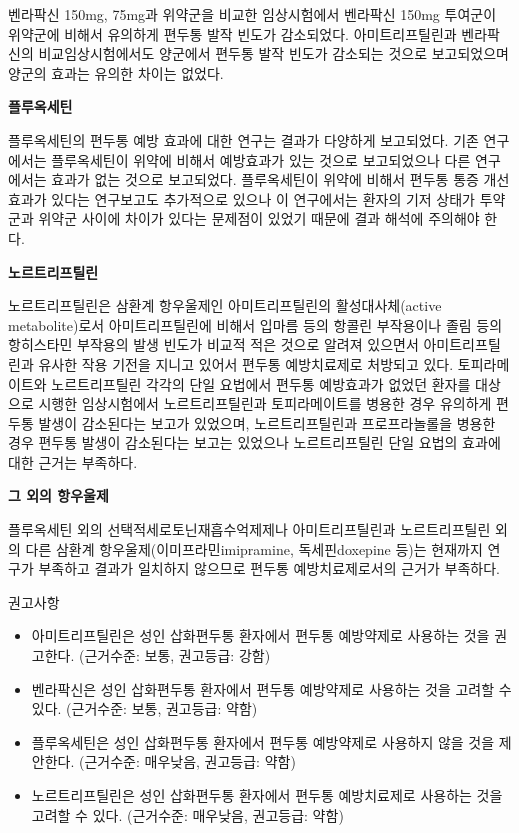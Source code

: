 \documentclass[]{book}
\begin{document}
벤라팍신 150mg, 75mg과 위약군을 비교한 임상시험에서 벤라팍신 150mg 투여군이 위약군에 비해서 유의하게 편두통 발작 빈도가 감소되었다. 아미트리프틸린과 벤라팍신의 비교임상시험에서도 양군에서 편두통 발작 빈도가 감소되는 것으로 보고되었으며 양군의 효과는 유의한 차이는 없었다.

\textbf{플루옥세틴}

플루옥세틴의 편두통 예방 효과에 대한 연구는 결과가 다양하게 보고되었다. 기존 연구에서는 플루옥세틴이 위약에 비해서 예방효과가 있는 것으로 보고되었으나 다른 연구에서는 효과가 없는 것으로 보고되었다. 플루옥세틴이 위약에 비해서 편두통 통증 개선 효과가 있다는 연구보고도 추가적으로 있으나 이 연구에서는 환자의 기저 상태가 투약군과 위약군 사이에 차이가 있다는 문제점이 있었기 때문에 결과 해석에 주의해야 한다.

\textbf{노르트리프틸린}

노르트리프틸린은 삼환계 항우울제인 아미트리프틸린의 활성대사체(active metabolite)로서 아미트리프틸린에 비해서 입마름 등의 항콜린 부작용이나 졸림 등의 항히스타민 부작용의 발생 빈도가 비교적 적은 것으로 알려져 있으면서 아미트리프틸린과 유사한 작용 기전을 지니고 있어서 편두통 예방치료제로 처방되고 있다. 토피라메이트와 노르트리프틸린 각각의 단일 요법에서 편두통 예방효과가 없었던 환자를 대상으로 시행한 임상시험에서 노르트리프틸린과 토피라메이트를 병용한 경우 유의하게 편두통 발생이 감소된다는 보고가 있었으며, 노르트리프틸린과 프로프라놀롤을 병용한 경우 편두통 발생이 감소된다는 보고는 있었으나 노르트리프틸린 단일 요법의 효과에 대한 근거는 부족하다.

\textbf{그 외의 항우울제}

플루옥세틴 외의 선택적세로토닌재흡수억제제나 아미트리프틸린과 노르트리프틸린 외의 다른 삼환계 항우울제(이미프라민imipramine, 독세핀doxepine 등)는 현재까지 연구가 부족하고 결과가 일치하지 않으므로 편두통 예방치료제로서의 근거가 부족하다.

권고사항

\begin{itemize}
\item
  아미트리프틸린은 성인 삽화편두통 환자에서 편두통 예방약제로 사용하는 것을 권고한다. (근거수준: 보통, 권고등급: 강함)
\item
  벤라팍신은 성인 삽화편두통 환자에서 편두통 예방약제로 사용하는 것을 고려할 수 있다. (근거수준: 보통, 권고등급: 약함)
\item
  플루옥세틴은 성인 삽화편두통 환자에서 편두통 예방약제로 사용하지 않을 것을 제안한다. (근거수준: 매우낮음, 권고등급: 약함)
\item
  노르트리프틸린은 성인 삽화편두통 환자에서 편두통 예방치료제로 사용하는 것을 고려할 수 있다. (근거수준: 매우낮음, 권고등급: 약함)
\end{itemize}
\end{document}
